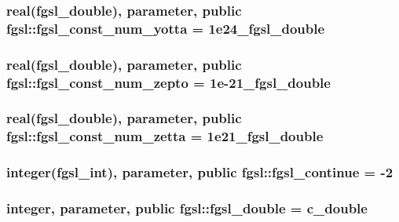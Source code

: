 \subsubsection[{fgsl\+\_\+const\+\_\+num\+\_\+yotta}]{\setlength{\rightskip}{0pt plus 5cm}real({\bf fgsl\+\_\+double}), parameter, public fgsl\+::fgsl\+\_\+const\+\_\+num\+\_\+yotta = 1e24\+\_\+fgsl\+\_\+double}\label{namespacefgsl_a0b9812de1b4fd0e830437a0f81756409}
\hypertarget{namespacefgsl_ac924f9358aa8ca1b7a72025328901e8e}{}
\subsubsection[{fgsl\+\_\+const\+\_\+num\+\_\+zepto}]{\setlength{\rightskip}{0pt plus 5cm}real({\bf fgsl\+\_\+double}), parameter, public fgsl\+::fgsl\+\_\+const\+\_\+num\+\_\+zepto = 1e-\/21\+\_\+fgsl\+\_\+double}\label{namespacefgsl_ac924f9358aa8ca1b7a72025328901e8e}
\hypertarget{namespacefgsl_adbd48c7f748a96cfbe32705159c06b84}{}
\subsubsection[{fgsl\+\_\+const\+\_\+num\+\_\+zetta}]{\setlength{\rightskip}{0pt plus 5cm}real({\bf fgsl\+\_\+double}), parameter, public fgsl\+::fgsl\+\_\+const\+\_\+num\+\_\+zetta = 1e21\+\_\+fgsl\+\_\+double}\label{namespacefgsl_adbd48c7f748a96cfbe32705159c06b84}
\hypertarget{namespacefgsl_adaee86adbad23b6853659f6564d6c46b}{}
\subsubsection[{fgsl\+\_\+continue}]{\setlength{\rightskip}{0pt plus 5cm}integer({\bf fgsl\+\_\+int}), parameter, public fgsl\+::fgsl\+\_\+continue = -\/2}\label{namespacefgsl_adaee86adbad23b6853659f6564d6c46b}
\hypertarget{namespacefgsl_a9af5113378e0f000eb479d3f90196ddf}{}
\subsubsection[{fgsl\+\_\+double}]{\setlength{\rightskip}{0pt plus 5cm}integer, parameter, public fgsl\+::fgsl\+\_\+double = c\+\_\+double}\label{namespacefgsl_a9af5113378e0f000eb479d3f90196ddf}
\hypertarget{namespacefgsl_a66d0fde3788cc0c300046f8fcd07d702}{}
